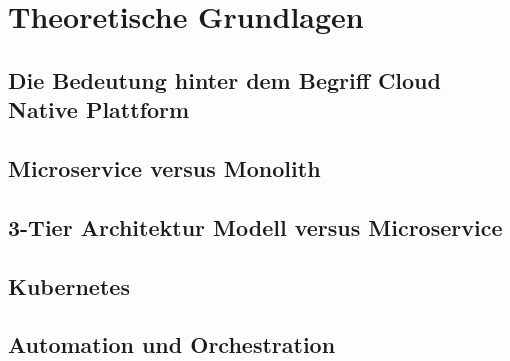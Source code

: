 \section{Theoretische Grundlagen}
\subsection{Die Bedeutung hinter dem Begriff Cloud Native Plattform}
\subsection{Microservice versus Monolith}
\subsection{3-Tier Architektur Modell versus Microservice}
\subsection{Kubernetes}
\subsection{Automation und Orchestration}